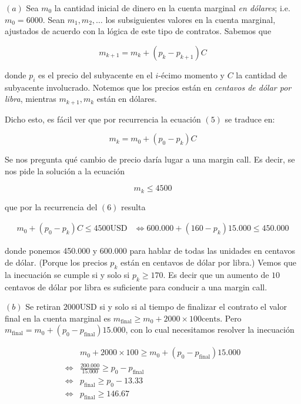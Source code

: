 \documentclass[a4paper, 12pt]{article}
\theoremstyle{definition}
\begin{document}
$(a)$ Sea $m_0$ la cantidad inicial de dinero en la cuenta marginal \textit{en
dólares}; i.e. $m_0 = 6000$. Sean $m_1, m_2, \ldots$ los subsiguientes valores
en la cuenta marginal, ajustados de acuerdo con la lógica de este tipo de
contratos. Sabemos que 

\begin{equation}
    m_{k+1} = m_k + (p_{k} - p_{k+1}) C
\end{equation}

donde $p_i$ es el precio del subyacente en el $i$-écimo momento y $C$ la
cantidad de subyacente involucrado. Notemos que los precios están en
\textit{centavos de dólar por libra}, mientras $m_{k+1}, m_k$ están en dólares.

Dicho esto, es fácil ver que por recurrencia la ecuación $(5)$ se traduce en: 

\begin{equation}
    m_{k} = m_0 + (p_0 - p_k)C
\end{equation}

Se nos pregunta qué cambio de precio daría lugar a una margin call. Es decir, se
nos pide la solución a la ecuación 

\begin{equation*}
    m_k \leq 4500
\end{equation*}

que por la recurrencia del $(6)$ resulta 

\begin{align*}
    m_0 + (p_0 - p_k)C \leq 4500\text{USD}
    &\iff 600.000 + (160 - p_k)15.000 \leq 450.000
\end{align*}

donde ponemos 450.000 y 600.000 para hablar de todas las unidades en centavos de
dólar. (Porque los precios $p_k$ están en centavos de dólar por libra.) Vemos
que la inecuación se cumple si y solo si $p_k \geq 170$. Es decir que un aumento
de $10$ centavos de dólar por libra es suficiente para conducir a una margin
call. 

$(b)$ Se retiran $2000$USD si y solo si al tiempo de finalizar el contrato el
valor final en la cuenta marginal es $m_{\text{final}} \geq m_0 + 2000 \times 100
\text{cents}$.  Pero $m_{\text{final}} = m_0 + (p_{0} -
p_{\text{final}})15.000$, con lo cual necesitamos resolver la inecuación 

\begin{align*}
&m_0 + 2000 \times 100 \geq m_0 + (p_0 - p_{\text{final}})15.000 \\ 
    \iff &\frac{ 200.000 }{15.000} \geq p_0 - p_{\text{final}} \\ 
    \iff& p_{\text{final}} \geq p_0 - 13.33 \\ 
    \iff&p_{\text{final}} \geq 146.67
\end{align*}
\end{document}
